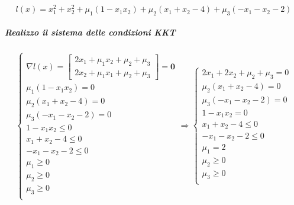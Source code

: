 \documentclass[\main/main.tex]{subfiles}
\begin{document}
\[
  l(x) = x^2_1+x^2_2 + \mu_1 (1-x_1x_2) + \mu_2 (x_1 + x_2 -4) + \mu_3 (-x_1 - x_2 - 2)
\]

\subparagraph*{Realizzo il sistema delle condizioni KKT}

\[
  \begin{cases}
    \nabla l(x) = \begin{bmatrix}
      2x_1 + \mu_1x_2 + \mu_2 + \mu_3 \\
      2x_2 + \mu_1x_1 + \mu_2 + \mu_3
    \end{bmatrix} = \bm{0} \\
    \mu_1 (1-x_1x_2) = 0                              \\
    \mu_2 (x_1 + x_2 -4) = 0                          \\
    \mu_3 (-x_1 - x_2 - 2) = 0                        \\
    1-x_1x_2 \leq 0                                   \\
    x_1 + x_2 -4 \leq 0                               \\
    -x_1 - x_2 - 2 \leq 0                             \\
    \mu_1 \geq 0                                      \\
    \mu_2 \geq 0                                      \\
    \mu_3 \geq 0                                      \\
  \end{cases}
  \Rightarrow
  \begin{cases}
    2x_1 + 2x_2 + \mu_2 + \mu_3 = 0 \\
    \mu_2 (x_1 + x_2 -4) = 0        \\
    \mu_3 (-x_1 - x_2 - 2) = 0      \\
    1-x_1x_2 = 0                    \\
    x_1 + x_2 -4 \leq 0             \\
    -x_1 - x_2 - 2 \leq 0           \\
    \mu_1 = 2                       \\
    \mu_2 \geq 0                    \\
    \mu_3 \geq 0                    \\
  \end{cases}
\]
\end{document}

